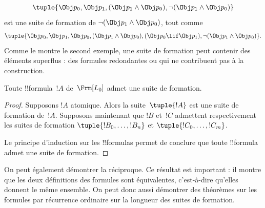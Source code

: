 \documentclass[11pt,a4paper,openany]{memoir}
\begin{document}
\begin{ex}
\[
\tuple{
    \Obj p_0,
    \Obj p_1,
    (\Obj p_1 \land \Obj p_0),
    \lnot (\Obj p_1 \land \Obj p_0)
}
\]
est une suite de formation de
$\lnot (\Obj p_1 \land \Obj p_0)$, tout comme
\[
\tuple{
    \Obj p_0,
    \Obj p_1,
    \Obj p_0,
    (\Obj p_1 \land \Obj p_0),
    (\Obj p_0 \lif \Obj p_1),
    \lnot (\Obj p_1 \land \Obj p_0)
}.
\]
%
Comme le montre le second exemple, une suite de formation peut
contenir des éléments superflus : des formules redondantes ou
qui ne contribuent pas à la construction.
\end{ex}

\begin{prop}
Toute !!{formula}~$!A$ de~$\Frm[L_0]$ admet une suite de formation.
\end{prop}

\begin{proof}
Supposons $!A$ atomique. Alors la suite~$\tuple{!A}$ est une suite
de formation de~$!A$.
%
Supposons maintenant que $!B$ et~$!C$ admettent respectivement les
suites de formation $\tuple{!B_0,\dotsc,!B_n}$ et
$\tuple{!C_0,\dotsc,!C_m}$.
%
\begin{enumerate}
\end{enumerate}
Le principe d'induction sur les !!{formula}s permet de conclure que
toute !!{formula} admet une suite de formation.
\end{proof}

On peut également démontrer la réciproque. Ce résultat est important :
il montre que les deux définitions des formules sont équivalentes,
c'est-à-dire qu'elles donnent le même ensemble. On peut donc aussi
démontrer des théorèmes sur les formules par récurrence ordinaire
sur la longueur des suites de formation.
\end{document}
